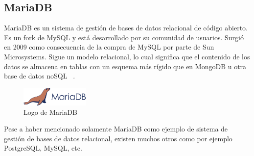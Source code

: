 \subsection{MariaDB}
MariaDB es un sistema de gestión de bases de datos relacional de código abierto. Es un fork de MySQL y está desarrollado por su comunidad de usuarios. Surgió en 2009 como
consecuencia de la compra de MySQL por parte de Sun Microsystems.
Sigue un modelo relacional, lo cual significa que el contenido de los datos se almacena en tablas con un esquema más rígido que en MongoDB u otra base de datos noSQL ~\cite{mariadb}.


\begin{figure}[H]
    \centering
    \includegraphics[width=0.3\textwidth]{imagenes/c2/mariadb.png}
    \caption{Logo de MariaDB}
\end{figure}

Pese a haber mencionado solamente MariaDB como ejemplo de sistema de gestión de bases de datos relacional, existen muchos otros como por ejemplo PostgreSQL, MySQL, etc.


